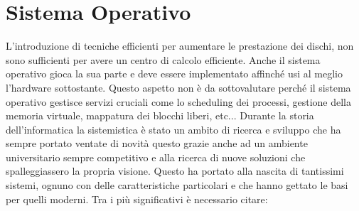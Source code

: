 \section{Sistema Operativo}
L'introduzione di tecniche efficienti per aumentare le prestazione dei dischi, non sono sufficienti per avere un centro di calcolo efficiente. Anche il sistema operativo gioca la sua parte e deve essere implementato affinché usi al meglio l'hardware sottostante. Questo aspetto non è da sottovalutare perché il sistema operativo gestisce servizi cruciali come lo scheduling dei processi, gestione della memoria virtuale, mappatura dei blocchi liberi, etc... Durante la storia dell'informatica la sistemistica è stato un ambito di ricerca e sviluppo che ha sempre portato ventate di novità questo grazie anche ad un ambiente universitario sempre competitivo e alla ricerca di nuove soluzioni che spalleggiassero la propria visione. Questo ha portato alla nascita di tantissimi sistemi, ognuno con delle caratteristiche particolari e che hanno gettato le basi per quelli moderni. Tra i più significativi è necessario citare:
